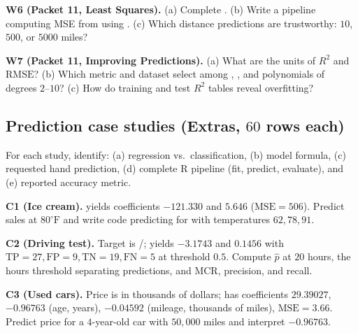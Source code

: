 \documentclass[10pt]{scrartcl}
\begin{document}
\begin{prob}
\textbf{W6 (Packet 11, Least Squares).} (a) Complete . (b) Write a  pipeline computing MSE from  using . (c) Which distance predictions are trustworthy: $10$, $500$, or $5000$ miles?
\end{prob}

\begin{prob}
\textbf{W7 (Packet 11, Improving Predictions).} (a) What are the units of $R^2$ and $\mathrm{RMSE}$? (b) Which metric and dataset select among , , and polynomials of degrees $2$--$10$? (c) How do training and test $R^2$ tables reveal overfitting?
\end{prob}

\subsection{Prediction case studies (Extras, $60$ rows each)}

For each study, identify: (a) regression vs.\ classification, (b) model formula, (c) requested hand prediction, (d) complete R pipeline (fit, predict, evaluate), and (e) reported accuracy metric.

\begin{prob}
\textbf{C1 (Ice cream).}  yields coefficients $-121.330$ and $5.646$ ($\mathrm{MSE} = 506$). Predict sales at $80^\circ\text{F}$ and write code predicting for  with temperatures $62, 78, 91$.
\end{prob}

\begin{prob}
\textbf{C2 (Driving test).} Target  is /;  yields $-3.1743$ and $0.1456$ with $\mathrm{TP}=27, \mathrm{FP}=9, \mathrm{TN}=19, \mathrm{FN}=5$ at threshold $0.5$. Compute $\hat p$ at $20$ hours, the hours threshold separating predictions, and MCR, precision, and recall.
\end{prob}

\begin{prob}
\textbf{C3 (Used cars).} Price is in thousands of dollars;  has coefficients $29.39027$, $-0.96763$ (age, years), $-0.04592$ (mileage, thousands of miles), $\mathrm{MSE} = 3.66$. Predict price for a $4$-year-old car with $50{,}000$ miles and interpret $-0.96763$.
\end{prob}
\end{document}
